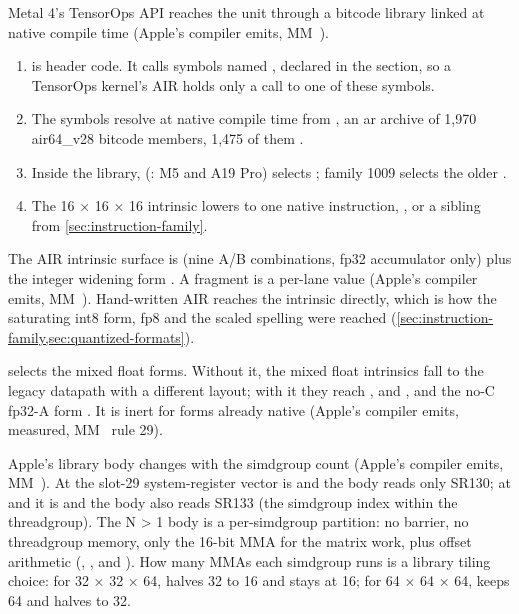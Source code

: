 Metal 4's TensorOps API reaches the unit through a bitcode library linked at native compile time (Apple's compiler
emits, MM~).

\begin{enumerate}
\def\labelenumi{\arabic{enumi}.}
\item {} is header code. It calls  symbols
  named , declared in the 
  section, so a TensorOps kernel's AIR holds only a call to one of these symbols.
\item The symbols resolve at native compile time from
  , an ar archive of 1,970 air64\_v28 bitcode
  members, 1,475 of them .
\item Inside the library,  (: M5 and A19 Pro) selects
  ; family 1009 selects the older
  .
\item The 16 × 16 × 16 intrinsic lowers to one native instruction, , or
  a sibling from \cref{sec:instruction-family}.
\end{enumerate}

The AIR intrinsic surface is
 (nine A/B combinations, fp32
accumulator only) plus the integer widening form . A fragment is a per-lane
 value (Apple's compiler emits, MM~). Hand-written AIR reaches the intrinsic directly, which is how the
saturating int8 form, fp8 and the scaled spelling were reached (\cref{sec:instruction-family,sec:quantized-formats}).

 selects the mixed float forms. Without it, the mixed float intrinsics fall to the legacy
datapath with a different layout; with it they reach ,  and , and the no-C fp32-A form
. It is inert for forms already native (Apple's compiler emits, measured, MM~ rule 29).

Apple's library body changes with the simdgroup count (Apple's compiler emits, MM~). At  the slot-29
system-register vector is \code{[52]} and the body reads only SR130; at  and  it is \code{[52, 53]} and the body also
reads SR133 (the simdgroup index within the threadgroup). The N > 1 body is a per-simdgroup partition: no barrier, no
threadgroup memory, only the 16-bit MMA for the matrix work, plus offset arithmetic (, ,  and ). How many MMAs each simdgroup runs is a library tiling choice: for 32 × 32 × 64,  halves 32 to
16 and  stays at 16; for 64 × 64 × 64,  keeps 64 and  halves to 32.

